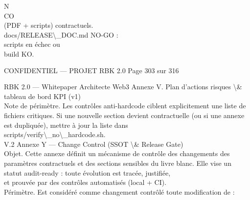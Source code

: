 \documentclass[12pt,landscape,a4paper]{article}
\newenvironment{confidential}
{\begin{tcolorbox}[
    colback=rbkred!5!white,
    colframe=rbkred!75!black,
    title=CONFIDENTIEL,
    fonttitle=\bfseries\color{white},
    coltitle=rbkred!75!black,
    breakable,
    enhanced,
    frame hidden,
    borderline west={2pt}{0pt}{rbkred!75!black}
]}
{\end{tcolorbox}}
\begin{document}
\vspace{0.5em}
\vspace{0.5em}
\vspace{0.5em}
\vspace{0.5em}
N\\
CO\\
(PDF + scripts)     contractuels.\\
docs/RELEASE\textbackslash{}_DOC.md NO-GO :\\
scripts en échec ou\\
build KO.\\
\vspace{0.5em}
\vspace{0.5em}
\vspace{0.5em}
\vspace{0.5em}
\begin{confidential}CONFIDENTIEL — PROJET RBK 2.0                                  Page 303 sur 316\end{confidential}
RBK 2.0 — Whitepaper Architecte Web3                                                                                         Annexe V. Plan d’actions risques \textbackslash{}& tableau de bord KPI (v1)\\
\vspace{0.5em}
\vspace{0.5em}
Note de périmètre. Les contrôles anti-hardcode ciblent explicitement une liste de fichiers critiques. Si une nouvelle section devient contractuelle (ou si une annexe est dupliquée), mettre à jour la liste dans\\
\vspace{0.5em}
scripts/verify\textbackslash{}_no\textbackslash{}_hardcode.sh.\\
\vspace{0.5em}
\vspace{0.5em}
\vspace{0.5em}
\vspace{0.5em}
V.2 Annexe Y — Change Control (SSOT \textbackslash{}& Release Gate)\\
Objet. Cette annexe définit un mécanisme de contrôle des changements des paramètres contractuels et des sections sensibles du livre blanc. Elle vise un statut audit-ready : toute évolution est tracée, justifiée,\\
\vspace{0.5em}
et prouvée par des contrôles automatisés (local + CI).\\
\vspace{0.5em}
Périmètre. Est considéré comme changement contrôlé toute modification de :\\
\end{document}
